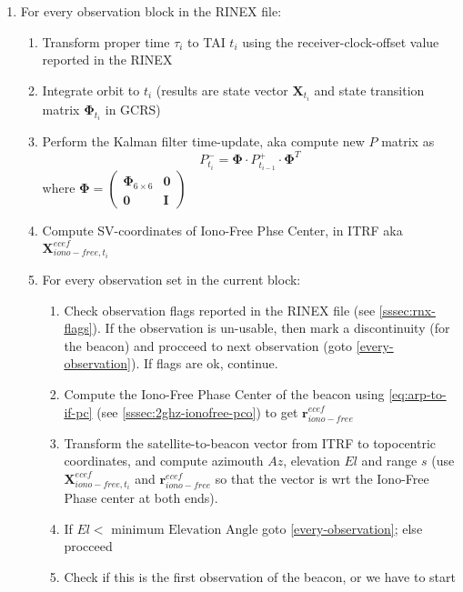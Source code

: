 \begin{enumerate}
  \item For every observation block in the RINEX file:
    \begin{enumerate}\label{every-block}
      \item Transform proper time $\tau _i$ to TAI $t_i$ using the receiver-clock-offset 
        value reported in the RINEX
      \item Integrate orbit to $t_i$ (results are state vector $\bm{X}_{t_i}$ and state 
        transition matrix $\bm{\Phi}_{t_i}$ in GCRS)
      \item Perform the Kalman filter time-update, aka compute new $P$ matrix as 
        \begin{equation}
          P^- _{t_i} = \bm{\Phi} \cdot P^+ _{t_{i-1}} \cdot \bm{\Phi}^T
        \end{equation}
        where $\bm{\Phi} = \begin{pmatrix} \bm{\Phi}_{6\times 6} & \bm{0} \\ \bm{0} & \bm{I} \end{pmatrix}$
        \item Compute SV-coordinates of Iono-Free Phse Center, in ITRF aka $\bm{X}^{ecef}_{iono-free,t_i}$
        \item For every observation set in the current block:
          \begin{enumerate}\label{every-observation}
            \item Check observation flags reported in the RINEX file (see \ref{sssec:rnx-flags}). 
              If the observation is un-usable, then mark a discontinuity (for the beacon) and procceed 
              to next observation (goto \ref{every-observation}). If flags are ok, continue.
            \item Compute the Iono-Free Phase Center of the beacon using \ref{eq:arp-to-if-pc} 
              (see \ref{sssec:2ghz-ionofree-pco}) to get $\bm{r}^{ecef}_{iono-free}$
            \item \label{cmp-rho} Transform the satellite-to-beacon vector from ITRF to topocentric coordinates, 
              and compute azimouth $Az$, elevation $El$ and range $s$ (use $\bm{X}^{ecef}_{iono-free,t_i}$ and 
              $\bm{r}^{ecef}_{iono-free}$ so that the vector is wrt the Iono-Free 
              Phase center at both ends).
            \item If $El < \text{ minimum Elevation Angle}$ goto \ref{every-observation}; else procceed
            \item Check if this is the first observation of the beacon, or we have to start 

\end{enumerate}
\end{enumerate}
\end{enumerate}
